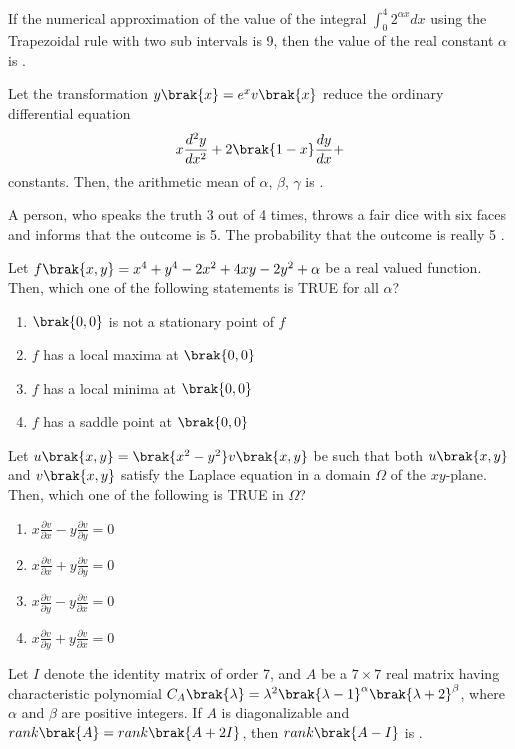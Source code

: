 \item If the numerical approximation of the value of the integral $\int_0^4 2^{\alpha x} dx$ using the Trapezoidal rule with two sub intervals is 9, then the value of the real constant $\alpha$ is \underline{\hspace{1cm}}.
\item Let the transformation $y\brak{x} = e^x v\brak{x}$ reduce the ordinary differential equation
$$x\frac{d^2y}{dx^2} + 2\brak{1-x}\frac{dy}{dx} +$$constants. Then, the arithmetic mean of $\alpha$, $\beta$, $\gamma$ is \underline{\hspace{1cm}}.
\item A person, who speaks the truth 3 out of 4 times, throws a fair dice with six faces and informs that the outcome is 5. The probability that the outcome is really 5 \underline{\hspace{1cm}}.
\item Let $f\brak{x,y} = x^4 + y^4 - 2x^2 + 4xy - 2y^2 + \alpha$ be a real valued function. Then, which one of the following statements is TRUE for all $\alpha$?
\begin{enumerate}
    \item $\brak{0,0}$ is not a stationary point of $f$
    \item $f$ has a local maxima at $\brak{0,0}$
    \item $f$ has a local minima at $\brak{0,0}$
    \item $f$ has a saddle point at $\brak{0,0}$
\end{enumerate}
\item Let $u\brak{x,y} = \brak{x^2 - y^2}v\brak{x,y}$ be such that both $u\brak{x,y}$ and $v\brak{x,y}$ satisfy the Laplace equation in a domain $\Omega$ of the $xy$-plane. Then, which one of the following is TRUE in $\Omega$?
\begin{enumerate}
    \item $x\frac{\partial v}{\partial x} - y\frac{\partial v}{\partial y} = 0$
    \item $x\frac{\partial v}{\partial x} + y\frac{\partial v}{\partial y} = 0$
    \item $x\frac{\partial v}{\partial y} - y\frac{\partial v}{\partial x} = 0$
    \item $x\frac{\partial v}{\partial y} + y\frac{\partial v}{\partial x} = 0$
\end{enumerate}
\item Let $I$ denote the identity matrix of order 7, and $A$ be a $7 \times 7$ real matrix having characteristic polynomial $C_A\brak{\lambda} = \lambda^2\brak{\lambda - 1}^\alpha\brak{\lambda + 2}^\beta$, where $\alpha$ and $\beta$ are positive integers. If $A$ is diagonalizable and $rank\brak{A} = rank\brak{A + 2I}$, then $rank\brak{A - I}$ is \underline{\hspace{1cm}}.

